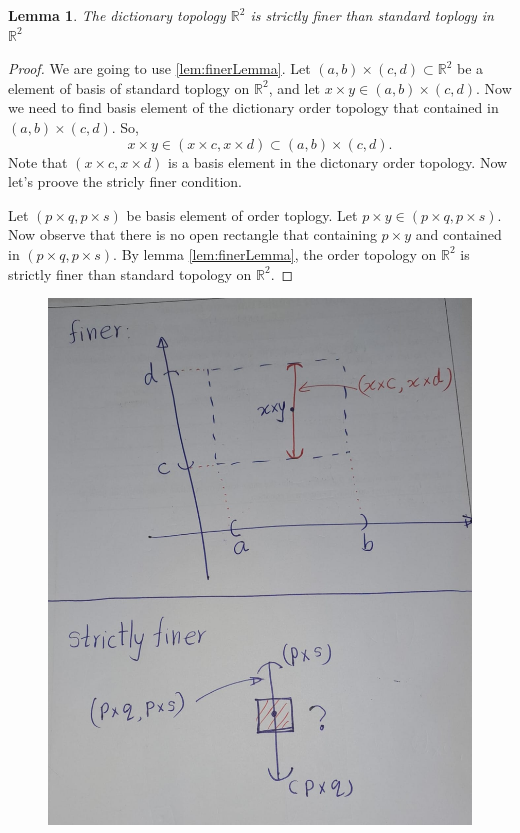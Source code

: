 \documentclass[
]{book}
\newtheorem{lemma}{Lemma}[chapter]
\theoremstyle{definition}
\theoremstyle{definition}
\theoremstyle{definition}
\theoremstyle{definition}
\theoremstyle{remark}
\begin{document}
\begin{lemma}
\protect\hypertarget{lem:unnamed-chunk-39}{}\label{lem:unnamed-chunk-39}The dictionary topology \(\mathbb{R}^2\) is strictly finer than standard toplogy in \(\mathbb{R}^2\)
\end{lemma}

\begin{proof}
We are going to use \ref{lem:finerLemma}.
Let \((a,b)\times(c,d)\subset\mathbb{R}^2\) be a element of basis of standard toplogy on \(\mathbb{R}^2\), and let \(x\times y\in (a,b)\times (c,d)\). Now we need to find basis element of the dictionary order topology that contained in \((a,b)\times (c,d)\).
So,
\[x\times y \in (x\times c ,x\times d)\subset (a,b)\times(c,d).\]
Note that \((x\times c ,x\times d)\) is a basis element in the dictonary order topology. Now let's proove the stricly finer condition.

Let \((p\times q,p \times s)\) be basis element of order toplogy. Let \(p\times y \in (p\times q,p \times s)\). Now observe that there is no open rectangle that containing \(p\times y\) and contained in \((p\times q,p \times s)\). By lemma \ref{lem:finerLemma}, the order topology on \(\mathbb{R}^2\) is strictly finer than standard topology on \(\mathbb{R}^2\).
\end{proof}

\begin{figure}
\centering
\includegraphics{figures/figure 11.jpg}
\caption{\label{fig:fig11}\(~\)}
\end{figure}
\end{document}
